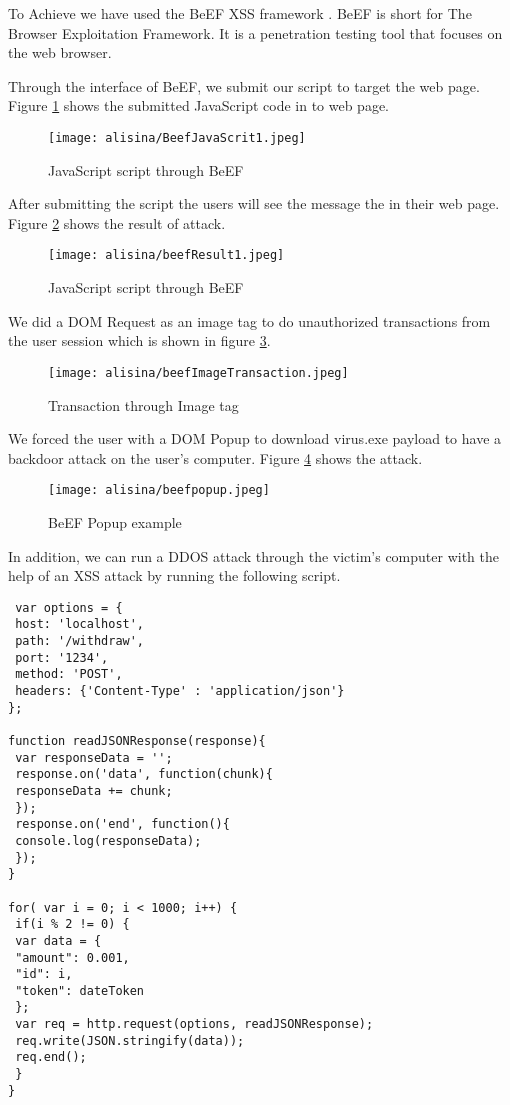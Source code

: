 To Achieve we have used the BeEF XSS framework \nocite{beefproject}. BeEF is short for The Browser Exploitation Framework. It is a penetration testing tool that focuses on the web browser.

Through the interface of BeEF, we submit our script to target the web page. Figure \ref{fig:beefForst} shows the submitted JavaScript code in to web page.
\begin{figure}[H]
    \centering
    \texttt{[image: alisina/BeefJavaScrit1.jpeg]}
    \caption{JavaScript script through BeEF}
    \label{fig:beefForst}
\end{figure}

After submitting the script the users will see the message the in their web page. Figure \ref{fig:beefFirstResult} shows the result of attack.
\begin{figure}[H]
    \centering
    \texttt{[image: alisina/beefResult1.jpeg]}
    \caption{JavaScript script through BeEF}
    \label{fig:beefFirstResult}
\end{figure}

We did a DOM Request as an image tag to do unauthorized transactions from the user session which is shown in figure \ref{fig:beefImageTransaction}.
\begin{figure}[H]
    \centering
    \texttt{[image: alisina/beefImageTransaction.jpeg]}
    \caption{Transaction through Image tag}
    \label{fig:beefImageTransaction}
\end{figure}

We forced the user with a DOM Popup to download virus.exe payload to have a backdoor attack on the user's computer. Figure \ref{fig:beefPopup} shows the attack.
\begin{figure}[H]
    \centering
    \texttt{[image: alisina/beefpopup.jpeg]}
    \caption{BeEF Popup example}
    \label{fig:beefPopup}
\end{figure}

In addition, we can run a DDOS attack through the victim's computer with the help of an XSS attack by running the following script.
\begin{verbatim}
 var options = {
 host: 'localhost', 
 path: '/withdraw',
 port: '1234', 
 method: 'POST',
 headers: {'Content-Type' : 'application/json'}
}; 

function readJSONResponse(response){
 var responseData = ''; 
 response.on('data', function(chunk){
 responseData += chunk;
 }); 
 response.on('end', function(){
 console.log(responseData);
 }); 
}

for( var i = 0; i < 1000; i++) {
 if(i % 2 != 0) {
 var data = {
 "amount": 0.001,
 "id": i,
 "token": dateToken
 };
 var req = http.request(options, readJSONResponse);
 req.write(JSON.stringify(data));
 req.end();
 }
}
\end{verbatim}
\nocite{sqlmap}
\nocite{zaproxy}
\nocite{burp}





